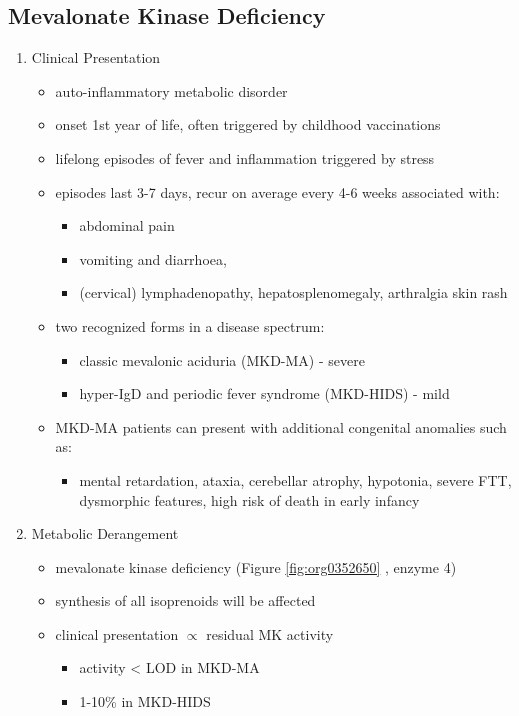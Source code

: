 \documentclass{scrartcl}
\begin{document}
\subsection{Mevalonate Kinase Deficiency}
\label{sec:org40604e3}
\begin{enumerate}
\item Clinical Presentation
\label{sec:org8bfb715}
\begin{itemize}
\item auto-inflammatory metabolic disorder
\item onset 1st year of life, often triggered by childhood vaccinations
\item lifelong episodes of fever and inflammation triggered by stress
\item episodes last 3-7 days, recur on average every 4-6 weeks associated with:
\begin{itemize}
\item abdominal pain
\item vomiting and diarrhoea,
\item (cervical) lymphadenopathy, hepatosplenomegaly, arthralgia skin rash
\end{itemize}
\item two recognized forms in a disease spectrum:
\begin{itemize}
\item classic mevalonic aciduria (MKD-MA) - severe
\item hyper-IgD and periodic fever syndrome (MKD-HIDS) - mild
\end{itemize}

\item MKD-MA patients can present with additional congenital anomalies
such as:
\begin{itemize}
\item mental retardation, ataxia, cerebellar atrophy, hypotonia, severe
FTT, dysmorphic features, high risk of death in early infancy
\end{itemize}
\end{itemize}

\item Metabolic Derangement
\label{sec:org9e975c5}
\begin{itemize}
\item mevalonate kinase deficiency (Figure \ref{fig:org0352650} , enzyme 4)
\end{itemize}
\begin{itemize}
\item synthesis of all isoprenoids will be affected
\item clinical presentation \(\propto\) residual MK activity
\begin{itemize}
\item activity < LOD in MKD-MA
\item 1-10\% in MKD-HIDS
\end{itemize}
\end{itemize}


\end{enumerate}
\end{document}
